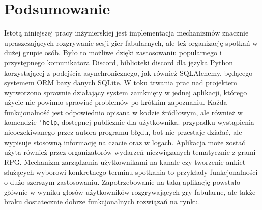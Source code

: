 \documentclass[shortabstract,inz]{iithesis}
\begin{document}
	\chapter{Podsumowanie}
	Istotą niniejszej pracy inżynierskiej jest implementacja mechanizmów znacznie upraszczających rozgrywanie sesji gier fabularnych, ale też organizację spotkań w dużej grupie osób. Było to możliwe dzięki zastosowaniu popularnego i przystępnego komunikatora Discord, biblioteki discord dla języka Python korzystającej z podejścia asynchronicznego, jak również SQLAlchemy, będącego systemem ORM bazy danych SQLite. W toku trwania prac nad projektem wytworzono sprawnie działający system zamknięty w jednej aplikacji, którego użycie nie powinno sprawiać problemów po krótkim zapoznaniu. Każda funkcjonalność jest odpowiednio opisana w kodzie źródłowym, ale również w komendzie \texttt{`help}, dostępnej publicznie dla użytkownika.  przypadku wystąpienia nieoczekiwanego przez autora programu błędu, bot nie przestaje działać, ale wypisuje stosowną informację na czacie oraz w logach. Aplikacja może zostać użyta również przez organizatorów wydarzeń niezwiązanych tematycznie z grami RPG. Mechanizm zarządzania użytkownikami na kanale czy tworzenie ankiet służących wyborowi konkretnego terminu spotkania to przykłady funkcjonalności o dużo szerszym zastosowaniu. Zapotrzebowanie na taką aplikację powstało głównie w wyniku głosów użytkowników rozgrywających gry fabularne, ale także braku dostatecznie dobrze funkcjonalnych rozwiązań na rynku.
	
\end{document}
